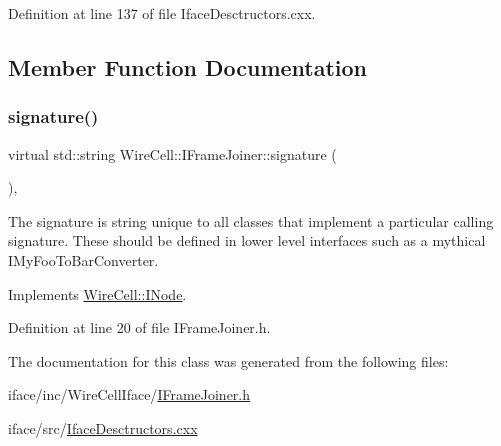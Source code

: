 Definition at line 137 of file Iface\+Desctructors.\+cxx.



\subsection{Member Function Documentation}
\mbox{\label{class_wire_cell_1_1_i_frame_joiner_a20082c7707a433faef85496553e7c7c1}} 
\subsubsection{\texorpdfstring{signature()}{signature()}}
{\footnotesize\ttfamily virtual std\+::string Wire\+Cell\+::\+I\+Frame\+Joiner\+::signature (\begin{DoxyParamCaption}{ }\end{DoxyParamCaption})\hspace{0.3cm}{\ttfamily [inline]}, {\ttfamily [virtual]}}

The signature is string unique to all classes that implement a particular calling signature. These should be defined in lower level interfaces such as a mythical I\+My\+Foo\+To\+Bar\+Converter. 

Implements \hyperlink{class_wire_cell_1_1_i_node_a0b0763465adf5ba7febe8e378162b584}{Wire\+Cell\+::\+I\+Node}.



Definition at line 20 of file I\+Frame\+Joiner.\+h.



The documentation for this class was generated from the following files\+:\begin{DoxyCompactItemize}
\item 
iface/inc/\+Wire\+Cell\+Iface/\hyperlink{_i_frame_joiner_8h}{I\+Frame\+Joiner.\+h}\item 
iface/src/\hyperlink{_iface_desctructors_8cxx}{Iface\+Desctructors.\+cxx}\end{DoxyCompactItemize}
